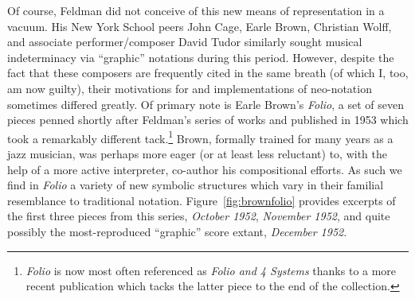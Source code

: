     Of course, Feldman did not conceive of this new means of representation in a vacuum. His New York School peers John Cage, Earle Brown, Christian Wolff, and associate performer/composer David Tudor similarly sought musical indeterminacy via ``graphic'' notations during this period. However, despite the fact that these composers are frequently cited in the same breath (of which I, too, am now guilty), their motivations for and implementations of neo-notation sometimes differed greatly. Of primary note is Earle Brown's \textit{Folio}, a set of seven pieces penned shortly after Feldman's series of works and published in 1953 which took a remarkably different tack.\footnote{\textit{Folio} is now most often referenced as \textit{Folio and 4 Systems} thanks to a more recent publication which tacks the latter piece to the end of the collection.} Brown, formally trained for many years as a jazz musician, was perhaps more eager (or at least less reluctant) to, with the help of a more active interpreter, co-author his compositional efforts.\autocite{Ryan_2002} As such we find in \textit{Folio} a variety of new symbolic structures which vary in their familial resemblance to traditional notation. Figure~\ref{fig:brownfolio} provides excerpts of the first three pieces from this series, \textit{October 1952}, \textit{November 1952}, and quite possibly the most-reproduced ``graphic'' score extant, \textit{December 1952}.


